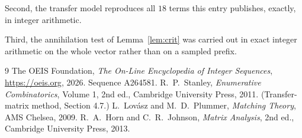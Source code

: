\documentclass[11pt,a4paper]{article}
\theoremstyle{plain}
\theoremstyle{definition}
\begin{document}
Second, the transfer model reproduces all $18$ terms this entry publishes, exactly, in
integer arithmetic.

Third, the annihilation test of Lemma~\ref{lem:crit} was carried out in exact integer
arithmetic on the whole vector rather than on a sampled prefix.

\begin{thebibliography}{9}
 The OEIS Foundation, \emph{The On-Line Encyclopedia of Integer
Sequences}, \url{https://oeis.org}, 2026. Sequence A264581.
 R.~P.~Stanley, \emph{Enumerative Combinatorics}, Volume 1, 2nd ed.,
Cambridge University Press, 2011. (Transfer-matrix method, Section 4.7.)
 L.~Lov\'asz and M.~D.~Plummer, \emph{Matching Theory}, AMS Chelsea, 2009.
 R.~A.~Horn and C.~R.~Johnson, \emph{Matrix Analysis}, 2nd ed., Cambridge
University Press, 2013.
\end{thebibliography}
\end{document}
